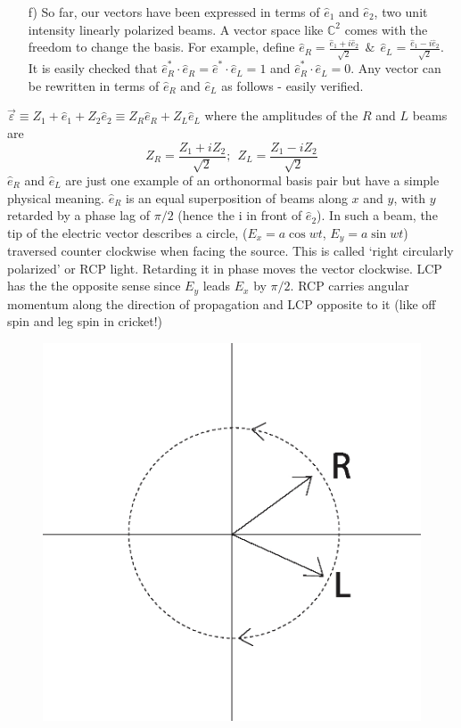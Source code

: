 \begin{itemize}
\item[f)] So far, our vectors have been expressed in terms of $\hat{e}_1$ and $\hat{e}_2$, two unit intensity
linearly polarized beams. A vector space like $\mathbb{C}^2$ comes with the freedom to
change the basis. For example, define $\hat{e}_R = \frac{\hat{e}_1 + i \hat{e}_2}{\sqrt{2}} ~~\&~~ \hat{e}_L = \frac{\hat{e}_1 - i \hat{e}_2}{\sqrt{2}}$. It is easily
checked that $\hat{e}^{\ast}_R  \cdot \hat{e}_R = \hat{e}^{\ast} \cdot \hat{e}_L = 1$ and $\hat{e}^{\ast}_R \cdot \hat{e}_L = 0$. Any vector can be rewritten
in terms of $\hat{e}_R$ and $\hat{e}_L$ as follows - easily verified.
\end{itemize}
$\overrightarrow{\varepsilon} \equiv Z_1 + \hat{e}_1 + Z_2 \hat{e}_2  \equiv Z_R \hat{e}_R + Z_L \hat{e}_L$ where the amplitudes of the $R$ and $L$ beams are 
$$
Z_R  = \dfrac{Z_1 + iZ_2}{\sqrt{2}} ; ~~ Z_L = \dfrac{Z_1 - iZ_2}{\sqrt{2}}
$$
$\hat{e}_R$ and $\hat{e}_L$ are just one example of an orthonormal basis pair but have a simple
physical meaning. $\hat{e}_R$ is an equal superposition of beams along $x$ and $y$, with
$y$ retarded by a phase lag of $\pi/2$ (hence the i in front of $\hat{e}_2$). In such a beam,
the tip of the electric vector describes a circle, ($E_x = a \cos wt$, $E_y = a \sin wt$)
traversed counter clockwise when facing the source. This is called `right circularly polarized' or RCP light. Retarding it in phase moves the vector clockwise.
LCP has the the opposite sense since $E_y$ leads $E_x$ by $\pi/2$. RCP carries angular
momentum along the direction of propagation and LCP opposite to it (like off
spin and leg spin in cricket!)
\smallskip

\begin{figure}[H]
\centering
\includegraphics[scale=0.25]{src/images/chap26/2.jpg}
\end{figure}
\bigskip


